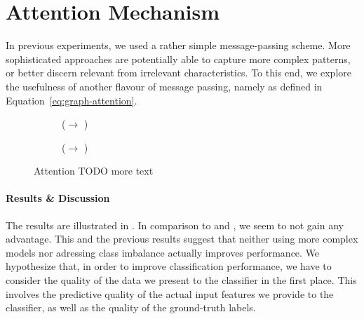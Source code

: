 \documentclass[
	fontsize=10pt, %
	twoside=false, %
	secnumdepth=1, %
  toc=indentunnumbered %
]{kaobook}
\begin{document}





\section{Attention Mechanism}

In previous experiments, we used a rather simple message-passing scheme. More
sophisticated approaches are potentially able to capture more complex patterns,
or better discern relevant from irrelevant characteristics. To this end, we
explore the usefulness of another flavour of message passing, namely  as defined in Equation~\ref{eq:graph-attention}.




\begin{figure}[h]
\centering
\begin{subfigure}[h]{0.48\linewidth}
  \caption{(\ADLast $\rightarrow$ \PDMap)}
\end{subfigure}
\begin{subfigure}[h]{0.48\linewidth}
  \caption{(\ADLast $\rightarrow$ \ReconMap{})}
\end{subfigure}
\caption{Attention TODO more text}
\label{fig:results-attention}
\end{figure}

\paragraph{Results \& Discussion} The results are illustrated in
. In comparison to 
and , we seem to not gain any advantage.
%
This and the previous results suggest that neither using more complex models nor
adressing class imbalance actually improves performance. We hypothesize that, in
order to improve classification performance, we have to consider the quality of
the data we present to the classifier in the first place. This involves the
predictive quality of the actual input features we provide to the classifier, as
well as the quality of the ground-truth labels.
\end{document}
